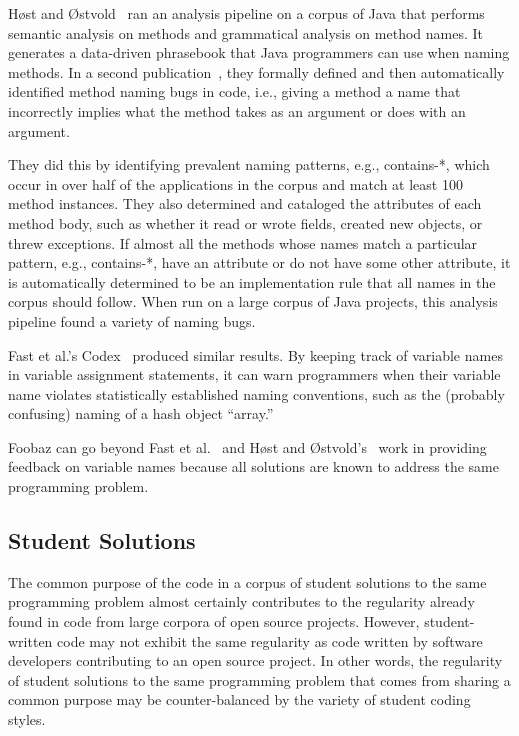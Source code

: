 H{{\o{}}}st and {{\O{}}}stvold~\cite{host2008java} ran an analysis pipeline on a corpus of Java that performs semantic analysis on methods and grammatical analysis on method names. It generates a data-driven phrasebook that Java programmers can use when naming methods. In a second publication~\cite{host2009debugging}, they formally defined and then automatically identified method naming bugs in code, i.e., giving a method a name that incorrectly implies what the method takes as an argument or does with an argument.

They did this by identifying prevalent naming patterns, e.g., contains-*, which occur in over half of the applications in the corpus and match at least 100 method instances. They also determined and cataloged the attributes of each method body, such as whether it read or wrote fields, created new objects, or threw exceptions. If almost all the methods whose names match a particular pattern, e.g., contains-*, have an attribute or do not have some other attribute, it is automatically determined to be an implementation rule that all names in the corpus should follow. When run on a large corpus of Java projects, this analysis pipeline found a variety of naming bugs.

Fast et al.'s Codex~\cite{codex} produced similar results. By keeping track of variable names in variable assignment statements, it can warn programmers when their variable name violates statistically established naming conventions, such as the (probably confusing) naming of a hash object ``array.'' 

Foobaz can go beyond Fast et al.~\cite{codex} and H{{\o{}}}st and {{\O{}}}stvold's~\cite{host2008java,host2009debugging} work in providing feedback on variable names because all solutions are known to address the same programming problem.

\subsection{Student Solutions}

The common purpose of the code in a corpus of student solutions to the same programming problem almost certainly contributes to the regularity already found in code from large corpora of open source projects. However, student-written code may not exhibit the same regularity as code written by software developers contributing to an open source project. In other words, the regularity of student solutions to the same programming problem that comes from sharing a common purpose may be counter-balanced by the variety of student coding styles. 

